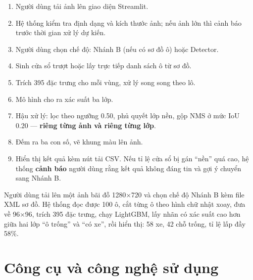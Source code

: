 \documentclass[12pt]{ai_conquer2026}
\begin{document}
\begin{enumerate}
\item Người dùng tải ảnh lên giao diện Streamlit.
\item Hệ thống kiểm tra định dạng và kích thước ảnh; nếu ảnh lớn thì cảnh báo trước thời gian xử lý dự kiến.
\item Người dùng chọn chế độ: Nhánh B (nếu có sơ đồ ô) hoặc Detector.
\item Sinh cửa sổ trượt hoặc lấy trực tiếp danh sách ô từ sơ đồ.
\item Trích 395 đặc trưng cho mỗi vùng, xử lý song song theo lô.
\item Mô hình cho ra xác suất ba lớp.
\item Hậu xử lý: lọc theo ngưỡng 0.50, phủ quyết lớp nền, gộp NMS ở mức IoU 0.20 --- \textbf{riêng từng ảnh và riêng từng lớp}.
\item Đếm ra ba con số, vẽ khung màu lên ảnh.
\item Hiển thị kết quả kèm nút tải CSV. Nếu tỉ lệ cửa sổ bị gán ``nền'' quá cao, hệ thống \textbf{cảnh báo} người dùng rằng kết quả không đáng tin và gợi ý chuyển sang Nhánh B.
\end{enumerate}

\begin{aivncodebox}
Người dùng tải lên một ảnh bãi đỗ 1280$\times$720 và chọn chế độ Nhánh B kèm file XML sơ đồ. Hệ thống đọc được 100 ô, cắt từng ô theo hình chữ nhật xoay, đưa về 96$\times$96, trích 395 đặc trưng, chạy LightGBM, lấy nhãn có xác suất cao hơn giữa hai lớp ``ô trống'' và ``có xe'', rồi hiển thị: 58 xe, 42 chỗ trống, tỉ lệ lấp đầy 58\%.
\end{aivncodebox}

\newpage
\section{Công cụ và công nghệ sử dụng}
\end{document}
